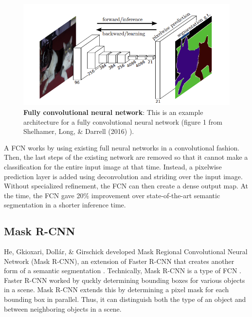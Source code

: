 \documentclass[twoside]{report}
\begin{document}
\begin{figure}[ht]
  \begin{center}
    \includegraphics[scale=1]{fcnn.png}
    \caption{{\bf Fully convolutional neural network}: This is an example architecture for a fully convolutional neural network (figure 1 from Shelhamer, Long, \& Darrell (2016) \cite{fcnn}).  }
    \label{fig:fcnn}
 \end{center}
\end{figure}

A FCN works by using existing full neural networks in a convolutional fashion. Then, the last steps of the existing network are removed so that it cannot make a classification for the entire input image at that time. Instead, a pixelwise prediction layer is added using deconvolution and striding over the input image. Without specialized refinement, the FCN can then create a dense output map. At the time, the FCN gave 20\% improvement over state-of-the-art semantic segmentation in a shorter inference time.

\subsection{Mask R-CNN}
He, Gkioxari, Doll{\'{a}}r, \& Girschick developed Mask Regional Convolutional Neural Network (Mask R-CNN), an extension of Faster R-CNN \cite{ren:2017} that creates another form of a semantic segmentation \cite{he:2017}. Technically, Mask R-CNN is a type of FCN \cite{fcnn}. Faster R-CNN worked by quckly determining bounding boxes for various objects in a scene. Mask R-CNN extends this by determining a pixel mask for each bounding box in parallel. Thus, it can distinguish both the type of an object and between neighboring objects in a scene. 
\end{document}
